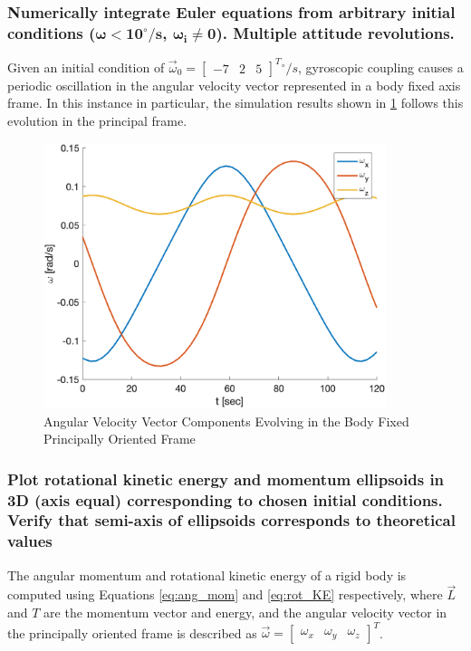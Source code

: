 \subsubsection{Numerically integrate Euler equations from arbitrary initial conditions ($\boldsymbol{\omega < 10^{\circ}/s}$, $\boldsymbol{\omega_i \neq 0}$). Multiple attitude revolutions.}

Given an initial condition of $\vec{\omega}_0 = \begin{bmatrix}
    -7 & 2 & 5
\end{bmatrix}^T {}^{\circ}/s$, gyroscopic coupling causes a periodic oscillation in the angular velocity vector represented in a body fixed axis frame. In this instance in particular, the simulation results shown in \ref{fig:sim_omegas} follows this evolution in the principal frame.

\begin{figure}[H]
    \centering
    \includegraphics[width = 10cm] {Images/omega_prop_random.png}
    \caption{Angular Velocity Vector Components Evolving in the Body Fixed Principally Oriented Frame}
    \label{fig:sim_omegas}
\end{figure}

\subsubsection{Plot rotational kinetic energy and momentum ellipsoids in 3D (axis equal) corresponding to chosen initial conditions. Verify that semi-axis of ellipsoids corresponds to theoretical values} \label{sec:ellipsoid_definitions}

The angular momentum and rotational kinetic energy of a rigid body is computed using Equations \ref{eq:ang_mom} and \ref{eq:rot_KE} respectively, where $\vec{L}$ and $T$ are the momentum vector and energy, and the angular velocity vector in the principally oriented frame is described as $\vec{\omega} = \begin{bmatrix} \omega_x & \omega_y & \omega_z \end{bmatrix}^T$. 

